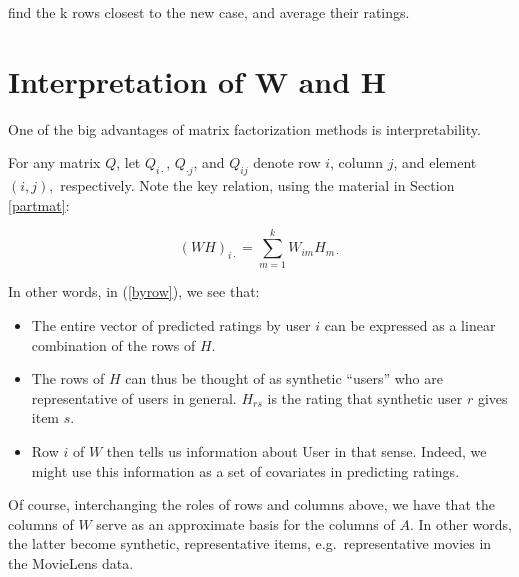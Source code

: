 find the k rows
closest to the new case, and 
average their ratings.

\section{Interpretation of W and H}

One of the big advantages of matrix factorization methods is
interpretability.

For any matrix $Q$, let $Q_{i \cdot }$, $Q_{\cdot j}$, and $Q_{ij}$
denote row $i$, column $j$, and element $(i,j),$ respectively.  Note the
key relation, using the material in Section \ref{partmat}:

\begin{equation}
\label{byrow}
(WH)_{i \cdot} = \sum_{m=1}^k W_{im} H_{m \cdot}
\end{equation}

In other words, in (\ref{byrow}), we see that:

\begin{itemize}

\item The entire vector of predicted ratings by user $i$ can be
expressed as a linear combination of the rows of $H$.

\item The rows of $H$ can thus be thought of as synthetic
``users'' who are representative of users in general.  $H_{rs}$ is the
rating that synthetic user $r$ gives item $s$.

\item Row $i$ of $W$ then tells us information about User in that
sense.  Indeed, we might use this information as a set of covariates in
predicting ratings.

\end{itemize} 

Of course, interchanging the roles of rows and columns above, we have
that the columns of $W$ serve as an approximate basis for the columns of
$A$.  In other words, the latter become synthetic, representative items,
e.g.\ representative movies in the MovieLens data.

% 
% 


